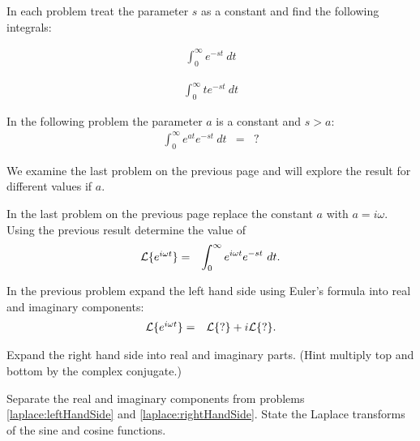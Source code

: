 \begin{problem}
\item In each problem treat the parameter $s$ as a constant and find
  the following integrals:
  \begin{subproblem}
  \item 
    \begin{eqnarray*}
      \int^\infty_0 e^{-st} ~ dt
    \end{eqnarray*}
    \vfill

  \item 
    \begin{eqnarray*}
      \int^\infty_0 te^{-st} ~ dt
    \end{eqnarray*}
    \vfill


  \item In the following problem the parameter $a$ is a constant and
    $s>a$:
    \begin{eqnarray*}
      \int^\infty_0 e^{at} e^{-st} ~ dt & = & ?
    \end{eqnarray*}
    \vfill

  \end{subproblem}
  

  \clearpage

\item We examine the last problem on the previous page and will
  explore the result for different values if $a$.

  \begin{subproblem}
  \item In the last problem on the previous page replace the
    constant $a$ with $a=i\omega$. Using the previous result
    determine the value of
    \begin{eqnarray*}
      \laplace{e^{i\omega t}} & = & \int^\infty_0 e^{i\omega t} e^{-st} ~ dt.
    \end{eqnarray*}
    \vfill

  \item \label{laplace:leftHandSide} In the previous problem expand
    the left hand side using Euler's formula into real and imaginary
    components:
    \begin{eqnarray*}
      \laplace{e^{i\omega t}} & = & \laplace{?} + i \laplace{?}.
    \end{eqnarray*}
    \vfill

  \item \label{laplace:rightHandSide} Expand the right hand side
    into real and imaginary parts. (Hint multiply top and bottom by
    the complex conjugate.)

    \vfill

  \item Separate the real and imaginary components from problems
    \ref{laplace:leftHandSide} and
    \ref{laplace:rightHandSide}. State the Laplace transforms of the
    sine and cosine functions.  \vfill


  \end{subproblem}


\end{problem}


